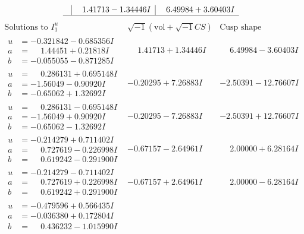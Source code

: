 \documentclass[1p]{elsarticle_modified}
\theoremstyle{definition}
\newcommand{\I}{\sqrt{-1}}
\begin{document}
$$\begin{array}{c|c|c}
 & \phantom{-}1.41713 - 1.34446 I & \phantom{-}6.49984 + 3.60403 I\\
 \hline 
 \end{array}$$\newpage$$\begin{array}{c|c|c}  
\text{Solutions to }I^u_{1}& \I (\text{vol} + \sqrt{-1}CS) & \text{Cusp shape}\\
 \hline 
\begin{aligned}
u &= -0.321842 - 0.685356 I \\
a &= \phantom{-}1.44451 + 0.21818 I \\
b &= -0.055055 - 0.871285 I\end{aligned}
 & \phantom{-}1.41713 + 1.34446 I & \phantom{-}6.49984 - 3.60403 I \\ \hline\begin{aligned}
u &= \phantom{-}0.286131 + 0.695148 I \\
a &= -1.56049 - 0.90920 I \\
b &= -0.65062 + 1.32692 I\end{aligned}
 & -0.20295 + 7.26883 I & -2.50391 - 12.76607 I \\ \hline\begin{aligned}
u &= \phantom{-}0.286131 - 0.695148 I \\
a &= -1.56049 + 0.90920 I \\
b &= -0.65062 - 1.32692 I\end{aligned}
 & -0.20295 - 7.26883 I & -2.50391 + 12.76607 I \\ \hline\begin{aligned}
u &= -0.214279 + 0.711402 I \\
a &= \phantom{-}0.727619 - 0.226998 I \\
b &= \phantom{-}0.619242 - 0.291900 I\end{aligned}
 & -0.67157 - 2.64961 I & \phantom{-}2.00000 + 6.28164 I \\ \hline\begin{aligned}
u &= -0.214279 - 0.711402 I \\
a &= \phantom{-}0.727619 + 0.226998 I \\
b &= \phantom{-}0.619242 + 0.291900 I\end{aligned}
 & -0.67157 + 2.64961 I & \phantom{-}2.00000 - 6.28164 I \\ \hline\begin{aligned}
u &= -0.479596 + 0.566435 I \\
a &= -0.036380 + 0.172804 I \\
b &= \phantom{-}0.436232 - 1.015990 I\end{aligned}

\end{array}$$
\end{document}
